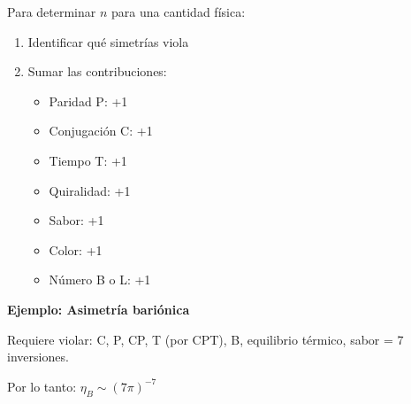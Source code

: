 \documentclass[12pt,a4paper,openany]{book}
\begin{document}
\begin{nivelmatematico}
Para determinar $n$ para una cantidad física:

\begin{enumerate}
    \item Identificar qué simetrías viola
    \item Sumar las contribuciones:
    \begin{itemize}
        \item Paridad P: +1
        \item Conjugación C: +1
        \item Tiempo T: +1
        \item Quiralidad: +1
        \item Sabor: +1
        \item Color: +1
        \item Número B o L: +1
    \end{itemize}
\end{enumerate}

\textbf{Ejemplo: Asimetría bariónica}

Requiere violar: C, P, CP, T (por CPT), B, equilibrio térmico, sabor = 7 inversiones.

Por lo tanto: $\eta_B \sim (7\pi)^{-7}$

\end{nivelmatematico}
\end{document}
